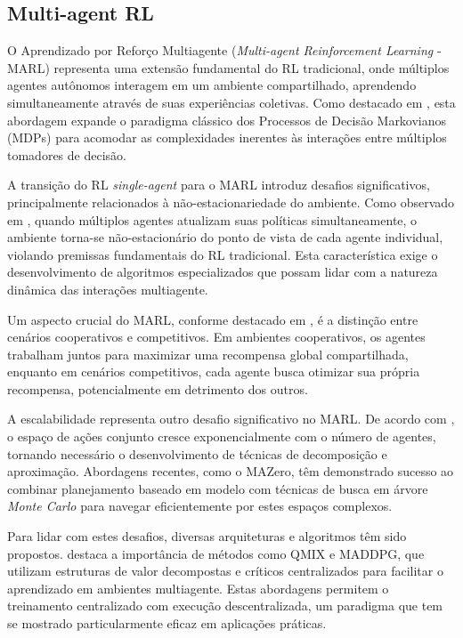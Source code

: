\subsection{Multi-agent RL}
\label{subsec:marl}

O Aprendizado por Reforço Multiagente (\textit{Multi-agent Reinforcement Learning} - MARL) representa uma extensão fundamental do RL tradicional, onde múltiplos agentes autônomos interagem em um ambiente compartilhado, aprendendo simultaneamente através de suas experiências coletivas. Como destacado em \cite{bruno_brandao}, esta abordagem expande o paradigma clássico dos Processos de Decisão Markovianos (MDPs) para acomodar as complexidades inerentes às interações entre múltiplos tomadores de decisão.

A transição do RL \textit{single-agent} para o MARL introduz desafios significativos, principalmente relacionados à não-estacionariedade do ambiente. Como observado em \cite{seac_multiagent}, quando múltiplos agentes atualizam suas políticas simultaneamente, o ambiente torna-se não-estacionário do ponto de vista de cada agente individual, violando premissas fundamentais do RL tradicional. Esta característica exige o desenvolvimento de algoritmos especializados que possam lidar com a natureza dinâmica das interações multiagente.

Um aspecto crucial do MARL, conforme destacado em \cite{review_cooperative_multi_agent}, é a distinção entre cenários cooperativos e competitivos. Em ambientes cooperativos, os agentes trabalham juntos para maximizar uma recompensa global compartilhada, enquanto em cenários competitivos, cada agente busca otimizar sua própria recompensa, potencialmente em detrimento dos outros.

A escalabilidade representa outro desafio significativo no MARL. De acordo com \cite{efficient_multi_agent}, o espaço de ações conjunto cresce exponencialmente com o número de agentes, tornando necessário o desenvolvimento de técnicas de decomposição e aproximação. Abordagens recentes, como o MAZero, têm demonstrado sucesso ao combinar planejamento baseado em modelo com técnicas de busca em árvore \textit{Monte Carlo} para navegar eficientemente por estes espaços complexos.

Para lidar com estes desafios, diversas arquiteturas e algoritmos têm sido propostos. \cite{agentes_inteligentes_puc} destaca a importância de métodos como QMIX e MADDPG, que utilizam estruturas de valor decompostas e críticos centralizados para facilitar o aprendizado em ambientes multiagente. Estas abordagens permitem o treinamento centralizado com execução descentralizada, um paradigma que tem se mostrado particularmente eficaz em aplicações práticas.


